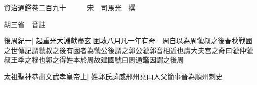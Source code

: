 






























































資治通鑑卷二百九十　　　宋　司馬光　撰

胡三省　音註

後周紀一|{
	起重光大淵獻盡玄困敦八月凡一年有奇　周自以為周虢叔之後春秋戰國之世傳記謂虢叔之後有國者為虢公後謂之郭公虢郭音相近也虞大夫宫之奇曰虢仲虢叔王季之穆也郭之得姓本於周故建國號曰周通鑑因謂之後周}


太祖聖神恭肅文武孝皇帝上|{
	姓郭氏諱威邢州堯山人父簡事晉為順州刺史}


